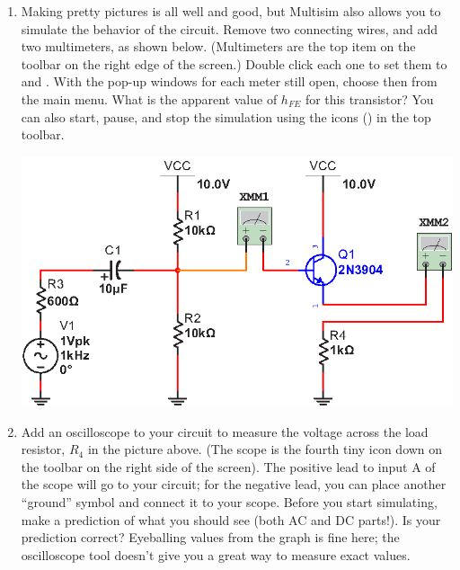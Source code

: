 \begin{enumerate}[wide]
\item Making pretty pictures is all well and good, but Multisim also allows you to simulate the behavior of the circuit.  Remove two connecting wires, and add two multimeters, as shown below.  (Multimeters are the top item on the toolbar on the right edge of the screen.)  Double click each one to set them to  and .  With the pop-up windows for each meter still open, choose  then  from the main menu.  What is the apparent value of $h_{FE}$ for this transistor?  You can also start, pause, and stop the simulation using the icons ()  in the top toolbar.
\begin{center}
\includegraphics{multisim/multimeters.eps}
\end{center}

\item Add an oscilloscope to your circuit to measure the voltage across the load resistor, $R_4$ in the picture above. (The scope is the fourth tiny icon down on the toolbar on the right side of the screen).  The positive lead to input A of the scope will go to your circuit; for the negative lead, you can place another ``ground'' symbol and connect it to your scope.  Before you start simulating, make a prediction of what you should see (both AC and DC parts!).  Is your prediction correct?  Eyeballing values from the graph is fine here; the oscilloscope tool doesn't give you a great way to measure exact values.


\end{enumerate}
